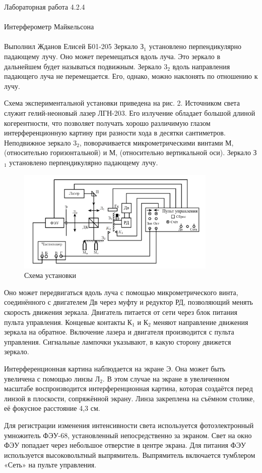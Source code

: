 \documentclass{astroedu-lab}
\begin{document}
\begin{problem}{\huge Лабораторная работа 4.2.4\\\\Интерферометр Майкельсона\\\\Выполнил Жданов Елисей Б01-205}
	Зеркало З$_1$ установлено перпендикулярно падающему лучу. Оно может перемещаться вдоль луча. Это зеркало в дальнейшем будет называться подвижным. Зеркало 3$_2$ вдоль направления падающего луча не перемещается. Его, однако, можно наклонять по отношению к лучу.
	
	Схема экспериментальной установки приведена на рис. 2. Источником света служит гелий-неоновый лазер ЛГН-203. Его излучение обладает большой длиной когерентности, что позволяет получать хорошо различимую глазом интерференционную картину при разности хода в десятки сантиметров. Неподвижное зеркало 3$_2$, поворачивается микрометрическими винтами М, (относительно горизонтальной) и М, (относительно вертикальной оси). Зеркало З$_1$ установлено перпендикулярно падающему лучу.
	\begin{figure}[h]
		\begin{center}
			\includegraphics[width = 0.85\textwidth]{424-2.png}
			\caption{Схема установки}
		\end{center}
	\end{figure}
	 Оно может передвигаться вдоль луча с помощью микрометрического винта, соединённого с двигателем Дв через муфту и редуктор РД, позволяющий менять скорость движения зеркала. Двигатель питается от сети через блок питания пульта управления. Концевые контакты К$_1$ и К$_2$ меняют направление движения зеркала на обратное. Включение лазера и двигателя производится с пульта управления. Сигнальные лампочки указывают, в какую сторону движется зеркало.
	 
	 Интерференционная картина наблюдается на экране Э. Она может быть увеличена с помощью линзы Л$_2$. В этом случае на экране в увеличенном масштабе воспроизводится интерференционная картина, которая создаётся перед линзой в плоскости, сопряжённой экрану. Линза закреплена на съёмном столике, её фокусное расстояние 4,3 см.
	 
	 Для регистрации изменения интенсивности света используется фотоэлектронный умножитель ФЭУ-68, установленный непосредственно за экраном. Свет на окно ФЭУ попадает через небольшое отверстие в центре экрана. Для питания ФЭУ используется высоковольтный выпрямитель. Выпрямитель включается тумблером «Сеть» на пульте управления.
	 

\end{problem}
\end{document}
